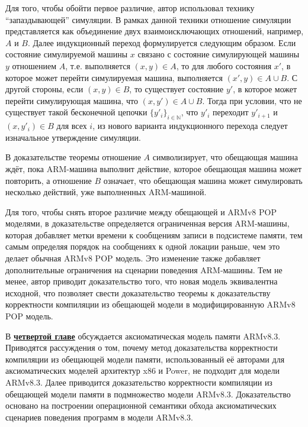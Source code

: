 Для того, чтобы обойти первое различие, автор использовал технику ``запаздывающей'' симуляции. В рамках данной техники отношение
симуляции представляется как объединение двух взаимоисключающих отношений, например, $A$ и $B$. Далее индукционный
переход формулируется следующим образом. Если состояние симулируемой машины $x$ связано с состояние симулирующей машины $y$ отношением $A$,
т.е. выполняется $(x,y) \in A$, то для любого состояния $x'$, в которое может перейти симулируемая машина, выполняется $(x', y) \in A \cup B$.
С другой стороны, если $(x, y) \in B$, то существует состояние $y'$, в которое может перейти симулирующая машина, что $(x, y') \in A \cup B$.
Тогда при условии, что не существует такой бесконечной цепочки $\{y'_i\}_{i \in \mathbb{N}}$, что $y'_i$ переходит $y'_{i+1}$ и $(x, y'_i) \in B$ для всех $i$,
из нового варианта индукционного перехода следует изначальное утверждение симуляции.

В доказательстве теоремы отношение $A$ символизирует, что обещающая машина ждёт, пока ARM-машина выполнит действие, которое обещающая
машина может повторить, а отношение $B$ означает, что обещающая машина может симулировать несколько действий, уже выполненных ARM-машиной.

Для того, чтобы снять второе различие между обещающей и ARMv8 POP моделями, в доказательстве определяется ограниченная версия ARM-машины,
которая добавляет метки времени к сообщениям записи в подсистеме памяти, тем самым определяя порядок на сообщениях к одной локации
раньше, чем это делает обычная ARMv8 POP модель. Это изменение также добавляет дополнительные ограничения на сценарии поведения ARM-машины.
Тем не менее, автор приводит доказательство того, что новая модель эквивалентна исходной, что позволяет свести доказательство теоремы 
к доказательству корректности компиляции из обещающей модели в модифицированную ARMv8 POP модель.

В \underline{\textbf{четвертой главе}} обсуждается аксиоматическая модель памяти ARMv8.3.
Приводятся рассуждения о том, почему метод доказательства корректности компиляции из
обещающей модели памяти, использованный её авторами для аксиоматических моделей архитектур x86 и Power,
не подходит для модели ARMv8.3. Далее приводится доказательство корректности компиляции из обещающей модели
памяти в подмножество модели ARMv8.3. Доказательство основано на построении операционной семантики обхода аксиоматических сценариев
поведения программ в модели ARMv8.3.

